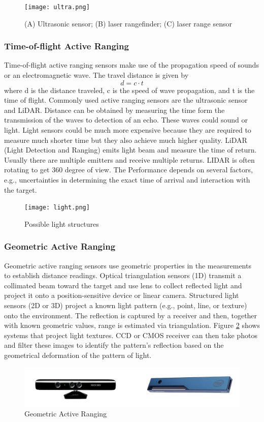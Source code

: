 \begin{itemize}
\begin{figure}
\centering
\texttt{[image: ultra.png]}
\caption{(A) Ultrasonic sensor; (B) laser rangefinder; (C) laser range sensor}
\label{fig:active_range}
\end{figure}

\subsubsection{Time-of-flight Active Ranging}
Time-of-flight active ranging sensors make use of the propagation speed of sounds or an electromagnetic wave. The travel distance is given by
$$d = c \cdot t$$
where d is the distance traveled, c is the speed of wave propagation, and t is the time of flight. Commonly used active ranging sensors are the ultrasonic sensor and LiDAR. Distance can be obtained by measuring the time form the transmission of the waves to detection of an echo. These waves could sound or light. Light sensors could be much more expensive because they are required to measure much shorter time but they also achieve much higher quality. LiDAR (Light Detection and Ranging) emits light beam and measure the time of return. Usually there are multiple emitters and receive multiple returns. LIDAR is often rotating to get 360 degree of view. The Performance depends on several factors, e.g., uncertainties in determining the exact time of arrival and interaction with the target.
\begin{figure}
\centering
\texttt{[image: light.png]}
\caption{Possible light structures \cite{SNS}}
\label{fig:3D_light}
\end{figure}


\subsubsection{Geometric Active Ranging}
Geometric active ranging sensors use geometric properties in the measurements to establish distance readings. Optical triangulation sensors (1D) transmit a collimated beam toward the target and use lens to collect reflected light and project it onto a position-sensitive device or linear camera. Structured light sensors (2D or 3D) project a known light pattern (e.g., point, line, or texture) onto the environment. The reflection is captured by a receiver and then, together with known geometric values, range is estimated via triangulation. Figure \ref{fig:3D_light} shows systems that project light textures. CCD or CMOS receiver can then take photos and filter these images to identify the pattern’s reflection based on the geometrical deformation of the pattern of light.
\begin{figure}[H]
\centering
        \includegraphics[width =12 cm]{lecture_4/imgs/geometric.png}
        \caption{Geometric Active Ranging}
\end{figure}

\end{itemize}
